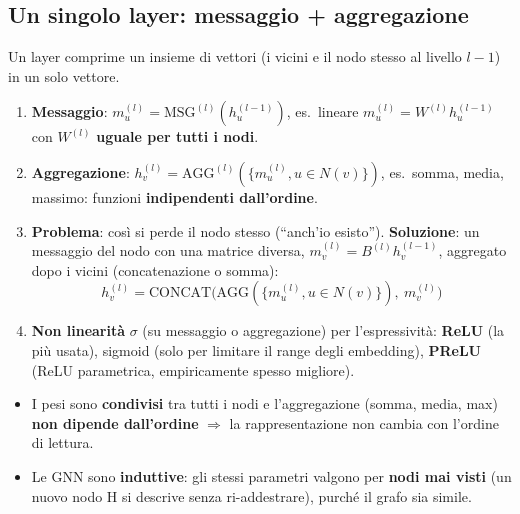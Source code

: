 \subsection{Un singolo layer: messaggio + aggregazione}
Un layer comprime un insieme di vettori (i vicini e il nodo stesso al livello $l-1$) in un solo vettore.
\begin{enumerate}
  \item \textbf{Messaggio}: $m_u^{(l)} = \mathrm{MSG}^{(l)}(h_u^{(l-1)})$, es.\ lineare $m_u^{(l)} = W^{(l)}h_u^{(l-1)}$ con
        $W^{(l)}$ \textbf{uguale per tutti i nodi}.
  \item \textbf{Aggregazione}: $h_v^{(l)} = \mathrm{AGG}^{(l)}(\{m_u^{(l)}, u\in N(v)\})$, es.\ somma, media, massimo: funzioni
        \textbf{indipendenti dall'ordine}.
  \item \textbf{Problema}: così si perde il nodo stesso (``anch'io esisto''). \textbf{Soluzione}: un messaggio del nodo con una matrice
        diversa, $m_v^{(l)} = B^{(l)}h_v^{(l-1)}$, aggregato dopo i vicini (concatenazione o somma):
        \[ h_v^{(l)} = \mathrm{CONCAT}\big(\mathrm{AGG}(\{m_u^{(l)}, u\in N(v)\}),\ m_v^{(l)}\big) \]
  \item \textbf{Non linearità} $\sigma$ (su messaggio o aggregazione) per l'espressività: \textbf{ReLU} (la più usata), sigmoid (solo per
        limitare il range degli embedding), \textbf{PReLU} (ReLU parametrica, empiricamente spesso migliore).
\end{enumerate}
\begin{esame}
\begin{itemize}
  \item I pesi sono \textbf{condivisi} tra tutti i nodi e l'aggregazione (somma, media, max) \textbf{non dipende dall'ordine}
        $\Rightarrow$ la rappresentazione non cambia con l'ordine di lettura.
  \item Le GNN sono \textbf{induttive}: gli stessi parametri valgono per \textbf{nodi mai visti} (un nuovo nodo H si descrive senza
        ri-addestrare), purché il grafo sia simile.
\end{itemize}
\end{esame}

